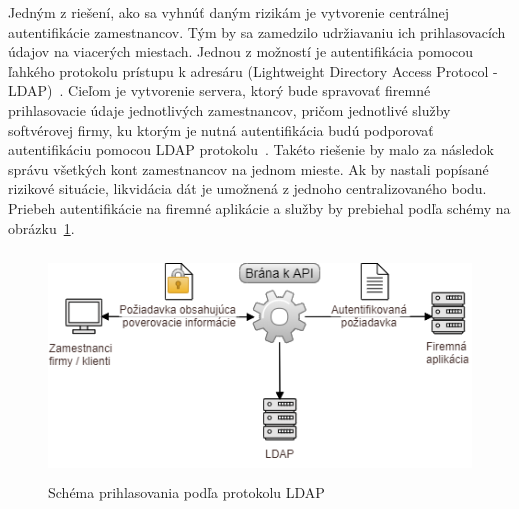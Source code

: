 \par Jedným z riešení, ako sa vyhnúť daným rizikám je vytvorenie centrálnej autentifikácie zamestnancov. Tým by sa
zamedzilo udržiavaniu ich prihlasovacích údajov na viacerých miestach. Jednou z možností je autentifikácia pomocou ľahkého
protokolu prístupu k adresáru (Lightweight Directory Access Protocol - LDAP)~\cite{LDAP}. Cieľom je vytvorenie
servera, ktorý bude spravovať firemné prihlasovacie údaje jednotlivých zamestnancov, pričom jednotlivé služby softvérovej
firmy, ku ktorým je nutná autentifikácia budú podporovať autentifikáciu pomocou LDAP protokolu~\cite{LDAP_AUTH}. Takéto riešenie by malo
za následok správu všetkých kont zamestnancov na jednom mieste. Ak by nastali popísané rizikové situácie, likvidácia dát je umožnená
z jednoho centralizovaného bodu. Priebeh autentifikácie na firemné aplikácie a služby by prebiehal podľa schémy na
obrázku~\ref{obr_5}.

\begin{figure}[H]
\begin{center}\includegraphics[width=\textwidth,height=6cm,keepaspectratio=true]{assets/ldap_schema.png}\end{center}
\caption[Schéma prihlasovania podľa protokolu LDAP]{Schéma prihlasovania podľa protokolu LDAP}\label{obr_5}
\end{figure}

